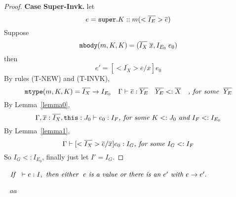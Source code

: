 \begin{proof}
\noindent \textbf{Case Super-Invk.}
let \[ e = \texttt{super}.K::m(<\overline{I_E}>\overline{e}) \]   
Suppose \[ \texttt{mbody}(m, K, K) = (\overline{I_X} \; \overline{x}, I_{E_0} \; e_0) \] 
then \[ e' =  [<\overline{I_X}>\overline{e}/\overline{x}] e_0 \] 
By rules (T-NEW) and (T-INVK), 
  \[ 
     \texttt{mtype}(m, K, K) = \overline{I_X} \rightarrow I_{E_0} \quad 
     \Gamma \; {\vdash} \; \overline{e} : \overline{Y_E} \quad
     \overline{Y_E} <: \overline{X} \quad
     \textit{, for some } \; \overline{Y_E}
  \]
By Lemma~\ref{lemma0},
    \[
    \Gamma, \overline{x}:\overline{I_X}, \texttt{this}:J_0 \; {\vdash} \; e_0:I_F \textit{, for some } K <: J_0 \textit{ and } I_F <: I_{E_0}
    \]
By Lemma~\ref{lemma1},
    \[
    \Gamma \; {\vdash} \; [<\overline{I_X}>\overline{e}/\overline{x} ] e_0  :  I_G \textit{, for some } I_G <: I_F 
    \]
So $I_G <: I_{E_0}$, finally just let $I' = I_G$.

\end{proof}

\begin{theorem}[Progress]~\label{theorem_progress}
$\textit{If } \ \; {\vdash} \; e : I, \textit{ then either } \ e 
\textit{ is a value or there is an } e' \textit{ with } e \rightarrow e'.$
\end{theorem}

\begin{theorem}~\label{theorem_soundness}
$aa$
\end{theorem}